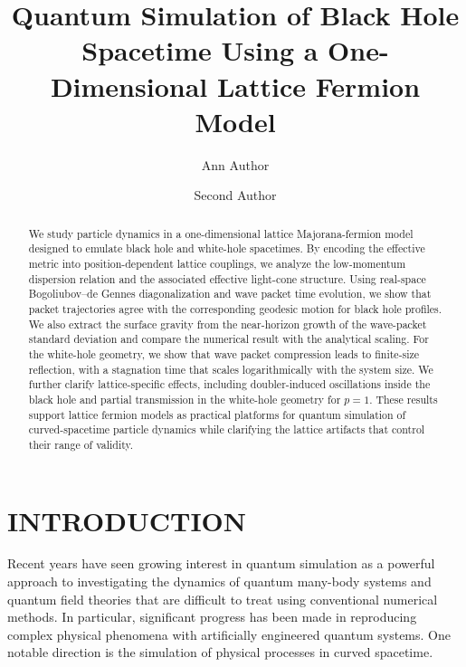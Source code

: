 \documentclass[reprint,amsmath,amssymb,aps,prb]{revtex4-2}
\begin{document}
\title{Quantum Simulation of Black Hole Spacetime Using a One-Dimensional Lattice Fermion Model}

\author{Ann Author}
\author{Second Author}%
%


\begin{abstract}
We study particle dynamics in a one-dimensional lattice Majorana-fermion model designed to emulate black hole and white-hole spacetimes. By encoding the effective metric into position-dependent lattice couplings, we analyze the low-momentum dispersion relation and the associated effective light-cone structure. Using real-space Bogoliubov--de Gennes diagonalization and wave packet time evolution, we show that packet trajectories agree with the corresponding geodesic motion for black hole profiles. We also extract the surface gravity from the near-horizon growth of the wave-packet standard deviation and compare the numerical result with the analytical scaling. For the white-hole geometry, we show that wave packet compression leads to finite-size reflection, with a stagnation time that scales logarithmically with the system size. We further clarify lattice-specific effects, including doubler-induced oscillations inside the black hole and partial transmission in the white-hole geometry for $p=1$. These results support lattice fermion models as practical platforms for quantum simulation of curved-spacetime particle dynamics while clarifying the lattice artifacts that control their range of validity.
\end{abstract}

\maketitle

\section{INTRODUCTION}
Recent years have seen growing interest in quantum simulation as a powerful approach to investigating the dynamics of quantum many-body systems and quantum field theories that are difficult to treat using conventional numerical methods. In particular, significant progress has been made in reproducing complex physical phenomena with artificially engineered quantum systems. One notable direction is the simulation of physical processes in curved spacetime.
\end{document}
